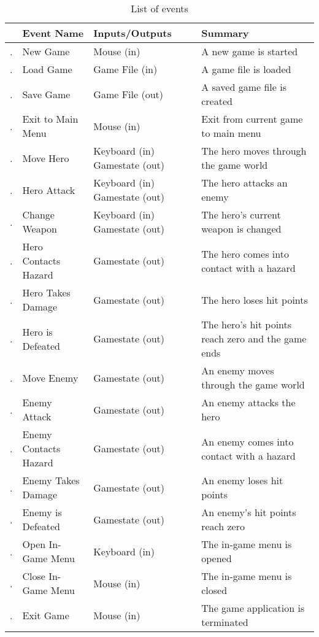 \documentclass[12pt, titlepage]{article}
\newcounter{EventList}
\newcommand{\printEvent}{
    \stepcounter{EventList}
    \arabic{EventList}.
}
\begin{document}
\begin{table}
\caption{List of events} \label{tab:events}
\begin{tabularx}{\textwidth}{p{0.5cm}>{\raggedright}p{3cm}>{\raggedright}p{3.5cm}>{\raggedright\arraybackslash}X}
\toprule & {\bf Event Name} & {\bf Inputs/Outputs} & {\bf Summary}\\
\midrule
\printEvent & New Game & Mouse (in) & A new game is started\\
\printEvent & Load Game & Game File (in) & A game file is loaded\\
\printEvent & Save Game & Game File (out) & A saved game file is created\\
\printEvent & Exit to Main Menu & Mouse (in) & Exit from current game to main menu\\
\printEvent & Move Hero & Keyboard (in) Gamestate (out) & The hero moves through the game world\\
\printEvent & Hero Attack & Keyboard (in) Gamestate (out) & The hero attacks an enemy\\
\printEvent & Change Weapon & Keyboard (in) Gamestate (out) & The hero's current weapon is changed\\
\printEvent & Hero Contacts Hazard & Gamestate (out) & The hero comes into contact with a hazard\\
\printEvent & Hero Takes Damage & Gamestate (out) & The hero loses hit points\\
\printEvent & Hero is Defeated & Gamestate (out) & The hero's hit points reach zero and the game ends\\
\printEvent & Move Enemy & Gamestate (out) & An enemy moves through the game world\\
\printEvent & Enemy Attack & Gamestate (out) & An enemy attacks the hero\\
\printEvent & Enemy Contacts Hazard & Gamestate (out)  & An enemy comes into contact with a hazard\\
\printEvent & Enemy Takes Damage & Gamestate (out) & An enemy loses hit points\\
\printEvent & Enemy is Defeated & Gamestate (out) & An enemy's hit points reach zero\\
\printEvent & Open In-Game Menu & Keyboard (in) & The in-game menu is opened\\
\printEvent & Close In-Game Menu & Mouse (in) & The in-game menu is closed\\
\printEvent & Exit Game & Mouse (in) & The game application is terminated\\
\bottomrule 
\end{tabularx}
\end{table}
\end{document}
